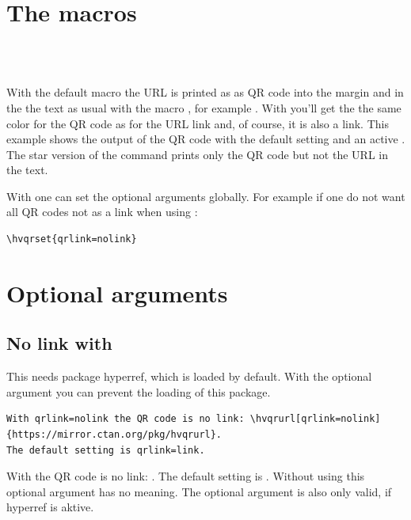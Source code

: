 \documentclass[twoside=on,usegeometry]{scrartcl}
\begin{document}
\section{The macros}

\begin{BDef}
\\
\\
\end{BDef}

With the default macro  the URL is printed as as QR code into the margin and
in the the text as usual with the macro , for example .
With  you'll get the the same color for the QR code as for  the URL link and, of course,
it is also a link. This example shows the output of the  QR code with the default setting and
an active .
The star version of the command
prints only the QR code but not the URL in the text.

With  one can set the optional arguments globally. For example if one do not want all
QR codes not as a link when using :

\begin{lstlisting}
\hvqrset{qrlink=nolink} 
\end{lstlisting}


\section{Optional arguments}

\subsection{No link with }

This needs package hyperref, which is loaded by default. With the optional argument
 you can prevent the loading of this package.

\begin{lstlisting}
With qrlink=nolink the QR code is no link: \hvqrurl[qrlink=nolink]{https://mirror.ctan.org/pkg/hvqrurl}.
The default setting is qrlink=link.
\end{lstlisting}
With  the QR code is no link: .
The default setting is . Without using  this optional argument
has no meaning. The optional argument  is also only valid, 
if hyperref is aktive.
\end{document}
